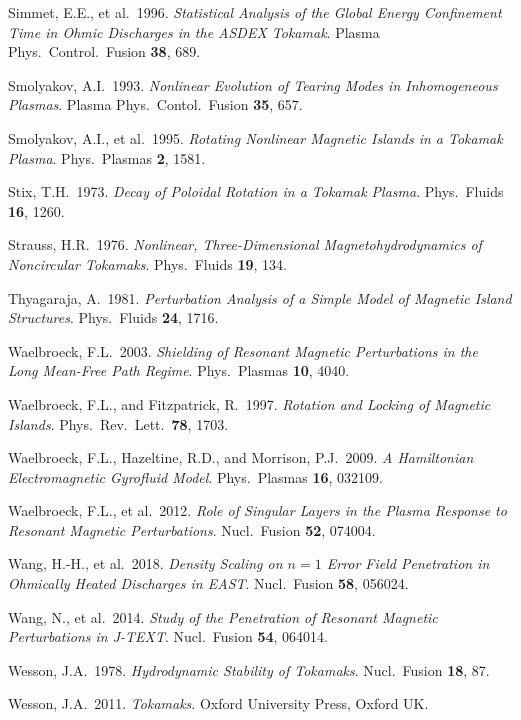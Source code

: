 \documentclass[notitlepage,12pt]{article}
\begin{document}
\begin{description}
\item Simmet, E.E., et al.\ 1996. {\em Statistical Analysis of the Global Energy Confinement Time in Ohmic Discharges in the ASDEX Tokamak}. Plasma Phys.\ Control.\ Fusion {\bf 38}, 689.
\item Smolyakov, A.I.\ 1993. {\em Nonlinear Evolution of Tearing Modes in Inhomogeneous Plasmas}. Plasma Phys.\ Contol.\ Fusion 
{\bf 35}, 657. 
\item Smolyakov, A.I., et al.\ 1995. {\em Rotating Nonlinear Magnetic Islands in a Tokamak Plasma}. Phys.\ Plasmas {\bf 2}, 1581.
\item Stix, T.H.\ 1973. {\em Decay of Poloidal Rotation in a Tokamak Plasma}. Phys.\ Fluids {\bf 16}, 1260.
\item Strauss, H.R.\ 1976. {\em Nonlinear, Three-Dimensional Magnetohydrodynamics of  Noncircular Tokamaks}. Phys.\ Fluids {\bf 19},  134.
\item Thyagaraja, A.\ 1981. {\em Perturbation Analysis of a Simple Model of Magnetic Island Structures}. Phys.\ Fluids {\bf 24}, 1716. 
\item Waelbroeck, F.L.\ 2003. {\em Shielding of Resonant Magnetic Perturbations in the Long Mean-Free Path Regime}. Phys.\ Plasmas {\bf 10}, 4040.
\item Waelbroeck, F.L., and Fitzpatrick, R.\ 1997. {\em Rotation and Locking of Magnetic Islands}. Phys.\ Rev.\ Lett.\ {\bf 78}, 1703. 
\item Waelbroeck, F.L., Hazeltine, R.D., and Morrison, P.J.\ 2009. {\em A Hamiltonian Electromagnetic Gyrofluid Model}. Phys.\ Plasmas {\bf 16}, 032109. 
\item Waelbroeck, F.L., et al.\ 2012. {\em Role of Singular Layers in the Plasma Response to Resonant Magnetic Perturbations}.
Nucl.\ Fusion {\bf 52}, 074004.
\item Wang, H.-H., et al.\ 2018. {\em Density Scaling on $n=1$ Error Field Penetration in Ohmically Heated Discharges in EAST}. 
Nucl.\ Fusion {\bf 58}, 056024. 
\item Wang, N., et al.\ 2014. {\em Study of the Penetration of Resonant Magnetic Perturbations in J-TEXT}. Nucl.\ Fusion {\bf 54}, 064014. 
\item Wesson, J.A.\  1978. {\em Hydrodynamic Stability of Tokamaks}. Nucl.\ Fusion {\bf 18}, 87.
\item Wesson, J.A.\ 2011. {\em Tokamaks}. Oxford University Press, Oxford UK.

\end{description}
\end{document}
